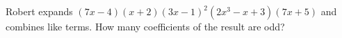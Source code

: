 Robert expands $(7x-4)(x+2)(3x-1)^2(2x^3-x+3)(7x+5)$ and combines like terms. How many coefficients of the result are odd?
